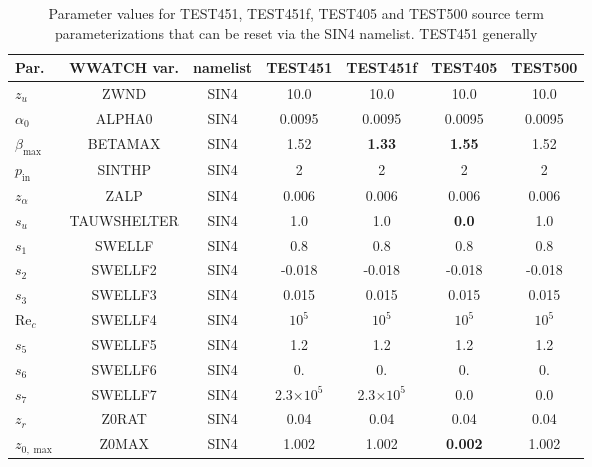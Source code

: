 \begin{table} \begin{center} {\tiny
\begin{tabular}{|l|c|c|c|c|c|c|} \hline \hline
Par.         &  WWATCH var.       & namelist & TEST451 & TEST451f & TEST405  & TEST500 \\
\hline
  $z_u$ &  ZWND                       & SIN4 & 10.0    & 10.0    & 10.0      & 10.0 \\
  $\alpha_0$ &  ALPHA0                & SIN4 & 0.0095  & 0.0095   & 0.0095    &  0.0095 \\
  $\beta_{\mathrm{max}}$ & BETAMAX    & SIN4 & 1.52    &\textbf{1.33}& \textbf{1.55}    &  1.52   \\
  $p_{\mathrm{in}}$ &  SINTHP         & SIN4 & 2       & 2       & 2         &  2      \\
  $z_\alpha$ &  ZALP                  & SIN4 & 0.006   & 0.006   & 0.006     &  0.006 \\
  $s_u$ &  TAUWSHELTER                & SIN4 & 1.0     & 1.0     & \textbf{0.0} & 1.0   \\
  $s_1$ &  SWELLF                     & SIN4 & 0.8     & 0.8     & 0.8       &  0.8 \\
  $s_2$ &  SWELLF2                    & SIN4 & -0.018  & -0.018  & -0.018    &  -0.018 \\
  $s_3$ &  SWELLF3                    & SIN4 &  0.015  &  0.015  &  0.015    &  0.015 \\
  $\mathrm{Re}_c$ &  SWELLF4                    & SIN4 & $10^5$  & $10^5$  & $10^5$    & $10^5$  \\
  $s_5$ &  SWELLF5                    & SIN4 & 1.2     & 1.2     & 1.2       &  1.2 \\
  $s_6$ &  SWELLF6                    & SIN4 & 0.      & 0.      & 0.        & 0.   \\
  $s_7$ &  SWELLF7                    & SIN4 & 2.3$\times 10^5$ & 2.3$\times 10^5$  & 0.0       &  0.0 \\
  $z_r$ &  Z0RAT                      & SIN4 & 0.04    & 0.04    & 0.04      &  0.04 \\
  $z_{0,\max}$ &  Z0MAX               & SIN4 & 1.002   & 1.002   &\textbf{0.002}&  1.002 \\
\hline
\end{tabular} }
 \end{center}
\caption{Parameter values for TEST451, TEST451f, TEST405 and TEST500 source term
parameterizations that can be reset via the SIN4 namelist. TEST451 generally
}
\end{table}
